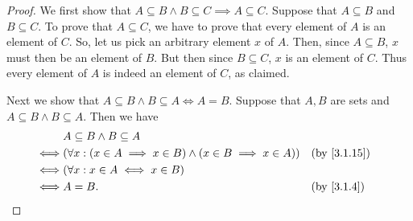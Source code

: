 \begin{proof}
  We first show that \(A \subseteq B \land B \subseteq C \implies A \subseteq C\).
  Suppose that \(A \subseteq B\) and \(B \subseteq C\).
  To prove that \(A \subseteq C\), we have to prove that every element of \(A\) is an element of \(C\).
  So, let us pick an arbitrary element \(x\) of \(A\).
  Then, since \(A \subseteq B\), \(x\) must then be an element of \(B\).
  But then since \(B \subseteq C\), \(x\) is an element of \(C\).
  Thus every element of \(A\) is indeed an element of \(C\), as claimed.

  Next we show that \(A \subseteq B \land B \subseteq A \iff A = B\).
  Suppose that \(A, B\) are sets and \(A \subseteq B \land B \subseteq A\).
  Then we have
  \begin{align*}
         & A \subseteq B \land B \subseteq A                                                                        \\
    \iff & (\forall x : (x \in A \implies x \in B) \land (x \in B \implies x \in A)) &  & \text{(by \cref{3.1.15})} \\
    \iff & (\forall x : x \in A \iff x \in B)                                                                       \\
    \iff & A = B.                                                                    &  & \text{(by \cref{3.1.4})}
  \end{align*}


\end{proof}
